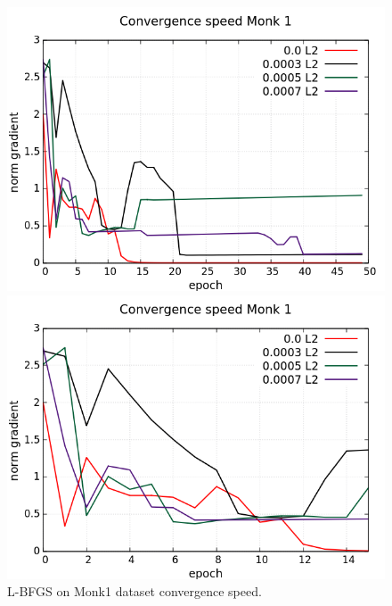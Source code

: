 \begin{figure}[H]
	\centering
	\begin{minipage}[t]{0.5\linewidth}
		\includegraphics[width=\linewidth]{data/LBFGS/Monk1/Monk1_LBFGS_L2_CS_standard.png}
	\end{minipage}%
	\begin{minipage}[t]{0.5\linewidth}
		\includegraphics[width=\linewidth]{data/LBFGS/Monk1/Monk1_LBFGS_L2_CS_zoom.png}
	\end{minipage}
	\caption{L-BFGS on Monk1 dataset convergence speed.}
\end{figure}
